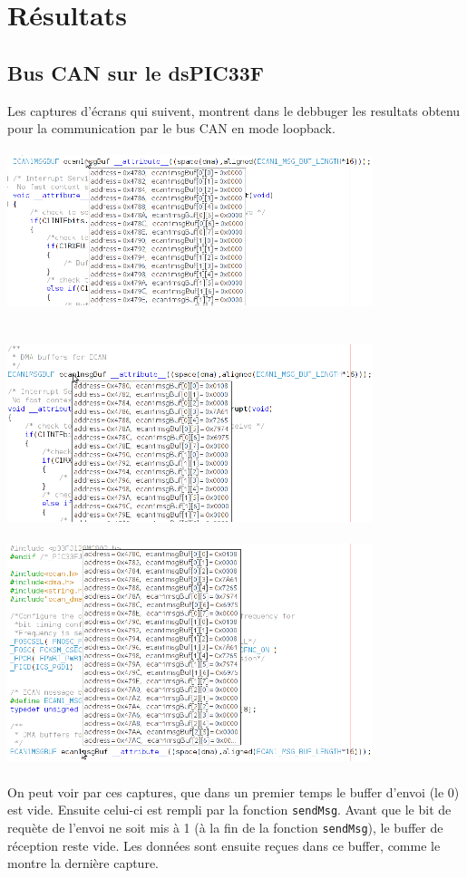\documentclass[a4,french,12pt]{article}
\begin{document}
\newpage
\section{Résultats}
\subsection{Bus CAN sur le dsPIC33F}
Les captures d'écrans qui suivent, montrent dans le debbuger les resultats obtenu pour la communication par le bus CAN en mode 
loopback. \\
\\
\includegraphics[width=0.8\textwidth]{images/CAN_avant_envoi.png}\\
\\
\\
\includegraphics[width=0.8\textwidth]{images/CAN_avant_reception.png}\\
\\
\includegraphics[width=0.8\textwidth]{images/CAN_apres_reception.png}\\
\\
On peut voir par ces captures, que dans un premier temps le buffer d'envoi (le 0) est vide. Ensuite celui-ci est rempli par 
la fonction \texttt{sendMsg}. Avant que le bit de requète de l'envoi ne soit mis à 1 (à la fin de la fonction \texttt{sendMsg}), 
le buffer de réception reste vide. Les données sont ensuite reçues dans ce buffer, comme le montre la dernière capture.
\end{document}
